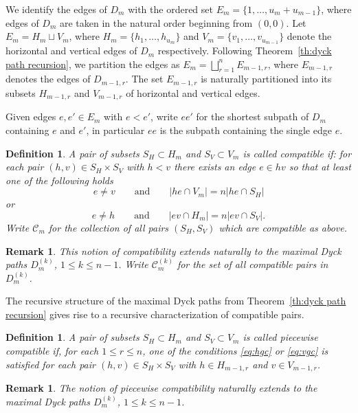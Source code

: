 \documentclass{amsart}
\newtheorem{definition}[theorem]{Definition}
\newtheorem{remark}[theorem]{Remark}
\newcommand{\cC}{\mathcal{C}}
\begin{document}
We identify the edges of $D_m$ with the ordered set $E_m=\{1,\ldots,u_m+u_{m-1}\}$, where edges of $D_m$ are taken in the natural order beginning from $(0,0)$.
Let $E_m=H_m\sqcup V_m$, where $H_m=\{h_1,\ldots,h_{u_m}\}$ and $V_m=\{v_1,\ldots,v_{u_{m-1}}\}$ denote the horizontal and vertical edges of $D_m$ respectively.
Following Theorem~\ref{th:dyck path recursion}, we partition the edges as $E_m=\bigsqcup_{r=1}^n E_{m-1,r}$, where $E_{m-1,r}$ denotes the edges of $D_{m-1,r}$.
The set $E_{m-1,r}$ is naturally partitioned into its subsets $H_{m-1,r}$ and $V_{m-1,r}$ of horizontal and vertical edges.

Given edges $e,e'\in E_m$ with $e<e'$, write $ee'$ for the shortest subpath of $D_m$ containing $e$ and $e'$, in particular $ee$ is the subpath containing the single edge $e$.
\begin{definition}
  \label{def:compatibility}
  A pair of subsets $S_H\subset H_m$ and $S_V\subset V_m$ is called \emph{compatible} if: 
  for each pair $(h,v)\in S_H\times S_V$ with $h<v$ there exists an edge $e\in hv$ so that at least one of the following holds
  \begin{equation}
    \label{eq:hgc}
    e\ne v\qquad\text{and}\qquad |he\cap V_m|=n|he\cap S_H|
  \end{equation}
  or
  \begin{equation}
    \label{eq:vgc}
    e\ne h\qquad\text{and}\qquad |ev\cap H_m|=n|ev\cap S_V|.
  \end{equation}
  Write $\cC_m$ for the collection of all pairs $(S_H,S_V)$ which are compatible as above.
\end{definition}
\begin{remark}
  This notion of compatibility extends naturally to the maximal Dyck paths $D_m^{(k)}$, $1\le k\le n-1$.  Write $\cC_m^{(k)}$ for the set of all compatible pairs in $D_m^{(k)}$.
\end{remark}

The recursive structure of the maximal Dyck paths from Theorem~\ref{th:dyck path recursion} gives rise to a recursive characterization of compatible pairs.
\begin{definition}
  \cite[Definition 3.11]{rupel}
  \label{def:piecewise compatibility}
  A pair of subsets $S_H\subset H_m$ and $S_V\subset V_m$ is called \emph{piecewise compatible} if, for each $1\le r\le n$, one of the conditions \eqref{eq:hgc} or \eqref{eq:vgc} is satisfied for each pair $(h,v)\in S_H\times S_V$ with $h\in H_{m-1,r}$ and $v\in V_{m-1,r}$.
\end{definition}
\begin{remark}
  The notion of piecewise compatibility naturally extends to the maximal Dyck paths $D_m^{(k)}$, $1\le k\le n-1$.
\end{remark}
\end{document}
